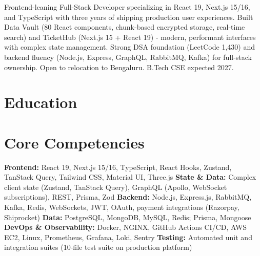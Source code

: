 \documentclass[11pt,a4paper,sans]{moderncv}
\begin{document}
\makecvtitle


\vspace{2pt}
\small{Frontend-leaning Full-Stack Developer specializing in React 19, Next.js 15/16, and TypeScript with three years of shipping production user experiences. Built Data Vault (80 React components, chunk-based encrypted storage, real-time search) and TicketHub (Next.js 15 + React 19) - modern, performant interfaces with complex state management. Strong DSA foundation (LeetCode 1,430) and backend fluency (Node.js, Express, GraphQL, RabbitMQ, Kafka) for full-stack ownership. Open to relocation to Bengaluru. B.Tech CSE expected 2027.}


\section{Education}
\vspace{1pt}


\section{Core Competencies}
\vspace{1pt}
\raggedright
\textbf{Frontend:} React 19, Next.js 15/16, TypeScript, React Hooks, Zustand, TanStack Query, Tailwind CSS, Material UI, Three.js \textbar{}
\textbf{State \& Data:} Complex client state (Zustand, TanStack Query), GraphQL (Apollo, WebSocket subscriptions), REST, Prisma, Zod \textbar{}
\textbf{Backend:} Node.js, Express.js, RabbitMQ, Kafka, Redis, WebSockets, JWT, OAuth, payment integrations (Razorpay, Shiprocket) \textbar{}
\textbf{Data:} PostgreSQL, MongoDB, MySQL, Redis; Prisma, Mongoose \textbar{}
\textbf{DevOps \& Observability:} Docker, NGINX, GitHub Actions CI/CD, AWS EC2, Linux, Prometheus, Grafana, Loki, Sentry \textbar{}
\textbf{Testing:} Automated unit and integration suites (10-file test suite on production platform)
\par\normalfont
\end{document}
